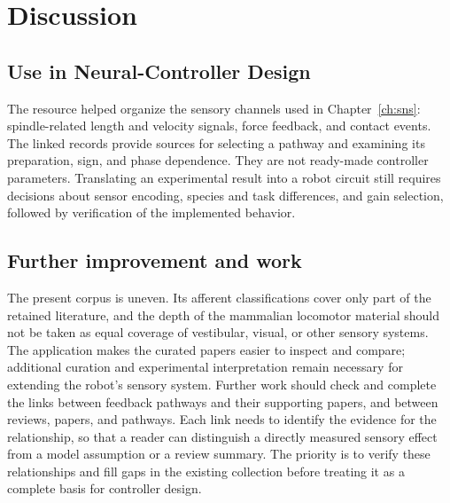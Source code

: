 \section{Discussion}

\subsection{Use in Neural-Controller Design}\label{sec:sadb_use}

The resource helped organize the sensory channels used in Chapter~\ref{ch:sns}: spindle-related length and velocity signals, force feedback, and contact events. The linked records provide sources for selecting a pathway and examining its preparation, sign, and phase dependence. They are not ready-made controller parameters. Translating an experimental result into a robot circuit still requires decisions about sensor encoding, species and task differences, and gain selection, followed by verification of the implemented behavior.

\subsection{Further improvement and work}

The present corpus is uneven. Its afferent classifications cover only part of the retained literature, and the depth of the mammalian locomotor material should not be taken as equal coverage of vestibular, visual, or other sensory systems. The application makes the curated papers easier to inspect and compare; additional curation and experimental interpretation remain necessary for extending the robot's sensory system.
 Further work should check and complete the links between feedback pathways and their supporting papers, and between reviews, papers, and pathways. Each link needs to identify the evidence for the relationship, so that a reader can distinguish a directly measured sensory effect from a model assumption or a review summary. The priority is to verify these relationships and fill gaps in the existing collection before treating it as a complete basis for controller design.